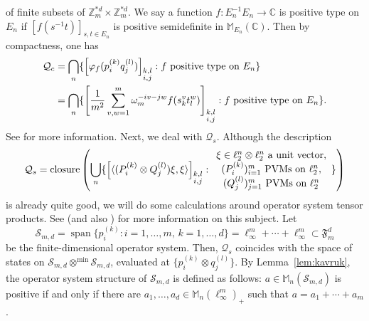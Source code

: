 \documentclass[12pt]{amsart}
\theoremstyle{definition}
\begin{document}
of finite subsets of ${{\mathbb Z}}_m^{*d}\times{{\mathbb Z}}_m^{*d}$.
We say a function $f\colon E_n^{-1}E_n\to{{\mathbb C}}$ is positive type on $E_n$
if $[f(s^{-1}t)]_{s,t\in E_n}$ is positive semidefinite in ${{\mathbb M}}_{E_n}({{\mathbb C}})$.
Then by compactness, one has
\begin{align*}
{{\mathcal Q}}_c &= \bigcap_n \{ {\left[ { {\varphi}_f(p_i^{(k)} q_j^{(l)})
 } \right]}_{\begin{subarray}{c}k,l\\ i,j\end{subarray}} : f \mbox{ positive type on $E_n$}\}\\
&= \bigcap_n \{ {\left[ { \frac{1}{m^2}\sum_{v,w=1}^m \omega_m^{-iv-jw} f(s_k^v t_l^w)
 } \right]}_{\begin{subarray}{c}k,l\\ i,j\end{subarray}} : f \mbox{ positive type on $E_n$}\}.
\end{align*}
See \cite{fritz} for more information.
Next, we deal with ${{\mathcal Q}}_s$. Although the description
\[
{{\mathcal Q}}_s=\mathop{\mathrm{closure}}\left( \bigcup_n
\{ {\left[ {{\mathopen{\langle}{(P_i^{(k)}\otimes Q_j^{(l)})\xi,\xi}\mathclose{\rangle}}} \right]}_{\begin{subarray}{c}k,l\\ i,j\end{subarray}} :
\begin{array}{c}
\mbox{$\xi\in\ell_2^n\otimes\ell_2^n$ a unit vector,}\\
\mbox{$(P_i^{(k)})_{i=1}^m$ PVMs on $\ell_2^n$,}\\
\mbox{$(Q_j^{(l)})_{j=1}^m$ PVMs on $\ell_2^n$}
\end{array}
\}\right)
\]
is already quite good, we will do some calculations around operator system tensor products.
See \cite{fkpt} (and also \cite{fp,kavruk,kptt}) for more information on this subject.
Let
\[
{{\mathcal S}}_{m,d}=\operatorname*{span}\{ p_i^{(k)} : i=1,\ldots,m,\,k=1,\ldots,d\}=\ell_\infty^m+\cdots+\ell_\infty^m\subset{{\mathfrak F}_m^d}
\]
be the finite-dimensional operator system.
Then, ${{\mathcal Q}}_s$ coincides with the space of states
on ${{\mathcal S}}_{m,d}\otimes^{\min}{{\mathcal S}}_{m,d}$, evaluated at
$\{ p^{(k)}_i\otimes q^{(l)}_j \}$.
By Lemma~\ref{lem:kavruk}, the operator system structure of ${{\mathcal S}}_{m,d}$
is defined as follows: $a\in{{\mathbb M}}_n({{\mathcal S}}_{m,d})$ is positive if and only if
there are $a_1,\ldots,a_d\in{{\mathbb M}}_n(\ell_\infty^m)_+$ such that $a=a_1+\cdots+a_m$.
\end{document}

